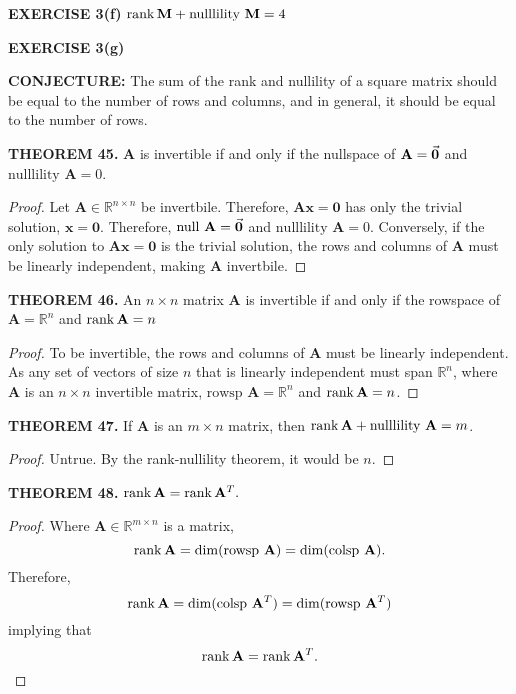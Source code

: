 \documentclass[12pt]{article}
\newcommand{\mat}[1]{\mathbf{#1}}
\newcommand{\exercise}[1]{\textbf{EXERCISE #1}\label{#1}}
\newcommand{\theorem}[2]{\textbf{THEOREM #1.} #2}
\newcommand{\conjecture}[1]{\textbf{CONJECTURE:} #1}
\newcommand{\nullsp}{\text{null }}
\newcommand{\nullility}{\text{nulllility }}
\newcommand{\rowsp}{\text{rowsp }}
\newcommand{\colsp}{\text{colsp }}
\begin{document}
\exercise{3(f)} $\rank \mat{M} + \nullility \mat{M} = 4$

\exercise{3(g)} 

\conjecture{The sum of the rank and nullility of a square matrix should be equal to the number of rows and columns, and in general, it should be equal to the number of rows.}

\theorem{45}{$\mat{A}$ is invertible if and only if the nullspace of $\mat{A} = \va{0}$ and $\nullility \mat{A} = 0$.}

\begin{proof}
Let $\mat{A} \in \mathbb{R}^{n \times n}$ be invertbile. Therefore, $\mat{Ax=0}$ has only the trivial solution, $\mat{x=0}$. Therefore, $\nullsp \mat{A} = \va{0}$ and $\nullility \mat{A} = 0$. Conversely, if the only solution to $\mat{Ax=0}$ is the trivial solution, the rows and columns of $\mat{A}$ must be linearly independent, making $\mat{A}$ invertbile.
\end{proof}

\theorem{46}{An $n \times n$ matrix $\mat{A}$ is invertible if and only if the rowspace of $\mat{A} = \mathbb{R}^{n}$ and $\rank \mat{A} = n$}

\begin{proof}
To be invertible, the rows and columns of $\mat{A}$ must be linearly independent. As any set of vectors of size $n$ that is linearly independent must span $\mathbb{R}^{n}$, where $\mat{A}$ is an $n \times n$ invertible matrix, $\rowsp \mat{A} = \mathbb{R}^{n}$ and $\rank \mat{A} = n$.
\end{proof}

\theorem{47}{If $\mat{A}$ is an $m \times n$ matrix, then $\rank \mat{A} + \nullility \mat{A} = m$.}

\begin{proof}
Untrue. By the rank-nullility theorem, it would be $n$.
\end{proof}

\theorem{48}{$\rank \mat{A} = \rank \mat{A}^{T}.$}

\begin{proof}
Where $\mat{A} \in \mathbb{R}^{m \times n}$ is a matrix, $$\rank \mat{A} = \dim (\rowsp \mat{A}) = \dim (\colsp \mat{A}).$$
Therefore,
$$\rank \mat{A} = \dim(\colsp \mat{A}^{T}) = \dim(\rowsp \mat{A}^{T})$$
implying that
$$\rank \mat{A} = \rank \mat{A}^{T}.$$
\end{proof}
\end{document}
